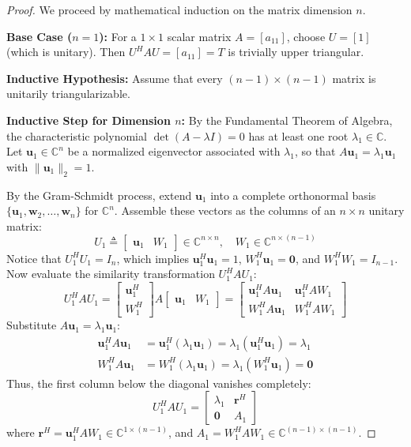 \begin{proof}
We proceed by mathematical induction on the matrix dimension $n$.

\textbf{Base Case ($n = 1$):}
For a $1 \times 1$ scalar matrix $A = [a_{11}]$, choose $U = [1]$ (which is unitary). Then $U^H A U = [a_{11}] = T$ is trivially upper triangular.

\textbf{Inductive Hypothesis:}
Assume that every $(n-1) \times (n-1)$ matrix is unitarily triangularizable.

\textbf{Inductive Step for Dimension $n$:}
By the Fundamental Theorem of Algebra, the characteristic polynomial $\det(A - \lambda I) = 0$ has at least one root $\lambda_1 \in \mathbb{C}$. Let $\mathbf{u}_1 \in \mathbb{C}^n$ be a normalized eigenvector associated with $\lambda_1$, so that $A\mathbf{u}_1 = \lambda_1 \mathbf{u}_1$ with $\|\mathbf{u}_1\|_2 = 1$.

By the Gram-Schmidt process, extend $\mathbf{u}_1$ into a complete orthonormal basis $\{\mathbf{u}_1, \mathbf{w}_2, \dots, \mathbf{w}_n\}$ for $\mathbb{C}^n$. Assemble these vectors as the columns of an $n \times n$ unitary matrix:
\begin{equation}
U_1 \triangleq \begin{bmatrix} \mathbf{u}_1 & W_1 \end{bmatrix} \in \mathbb{C}^{n \times n}, \quad W_1 \in \mathbb{C}^{n \times (n-1)}
\end{equation}
Notice that $U_1^H U_1 = I_n$, which implies $\mathbf{u}_1^H \mathbf{u}_1 = 1$, $W_1^H \mathbf{u}_1 = \mathbf{0}$, and $W_1^H W_1 = I_{n-1}$.
Now evaluate the similarity transformation $U_1^H A U_1$:
\begin{equation}
U_1^H A U_1 = \begin{bmatrix} \mathbf{u}_1^H \\ W_1^H \end{bmatrix} A \begin{bmatrix} \mathbf{u}_1 & W_1 \end{bmatrix} = \begin{bmatrix} \mathbf{u}_1^H A \mathbf{u}_1 & \mathbf{u}_1^H A W_1 \\ W_1^H A \mathbf{u}_1 & W_1^H A W_1 \end{bmatrix}
\end{equation}
Substitute $A\mathbf{u}_1 = \lambda_1 \mathbf{u}_1$:
\begin{align}
\mathbf{u}_1^H A \mathbf{u}_1 &= \mathbf{u}_1^H (\lambda_1 \mathbf{u}_1) = \lambda_1 (\mathbf{u}_1^H \mathbf{u}_1) = \lambda_1 \\
W_1^H A \mathbf{u}_1 &= W_1^H (\lambda_1 \mathbf{u}_1) = \lambda_1 (W_1^H \mathbf{u}_1) = \mathbf{0}
\end{align}
Thus, the first column below the diagonal vanishes completely:
\begin{equation}
U_1^H A U_1 = \begin{bmatrix} \lambda_1 & \mathbf{r}^H \\ \mathbf{0} & A_1 \end{bmatrix}
\end{equation}
where $\mathbf{r}^H = \mathbf{u}_1^H A W_1 \in \mathbb{C}^{1 \times (n-1)}$, and $A_1 = W_1^H A W_1 \in \mathbb{C}^{(n-1) \times (n-1)}$.


\end{proof}
